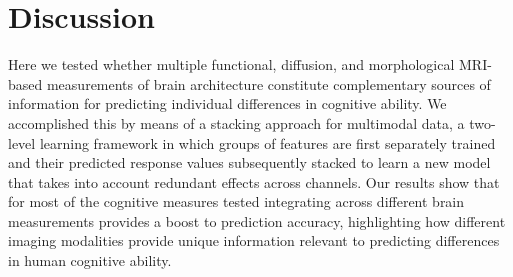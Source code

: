 \documentclass[10pt,letterpaper]{article}
\begin{document}
\subsection*{}

\section*{Discussion} \label{sec:discussion}
Here we tested whether multiple functional, diffusion, and morphological MRI-based measurements of brain architecture constitute complementary sources of information for predicting individual differences in cognitive ability. We accomplished this by means of a stacking approach for multimodal data, a two-level learning framework in which groups of features are first separately trained and their predicted response values subsequently stacked to learn a new model that takes into account redundant effects across channels. Our results show that for most of the cognitive measures tested integrating across different brain measurements provides a boost to prediction accuracy, highlighting how different imaging modalities provide unique information relevant to predicting differences in human cognitive ability. 
\end{document}
